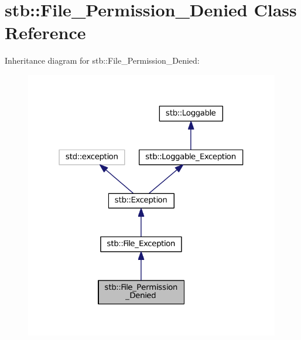 \hypertarget{classstb_1_1File__Permission__Denied}{\section{stb\+:\+:File\+\_\+\+Permission\+\_\+\+Denied Class Reference}
\label{classstb_1_1File__Permission__Denied}
}


Inheritance diagram for stb\+:\+:File\+\_\+\+Permission\+\_\+\+Denied\+:
\nopagebreak
\begin{figure}[H]
\begin{center}
\leavevmode
\includegraphics[width=316pt]{classstb_1_1File__Permission__Denied__inherit__graph}
\end{center}
\end{figure}


